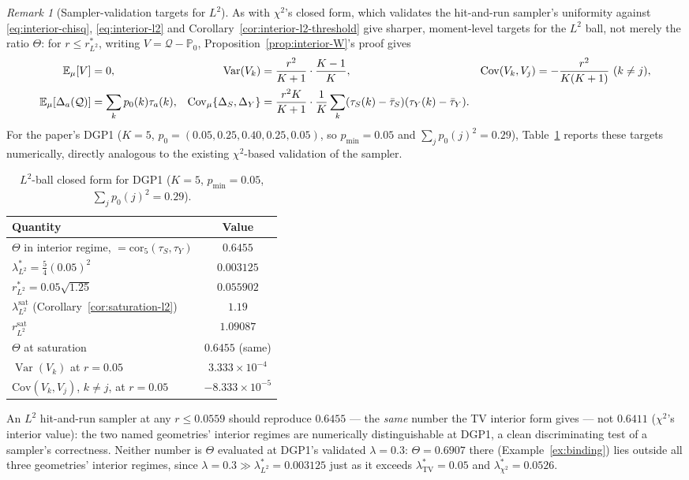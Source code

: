 \documentclass[11pt]{article}
\theoremstyle{plain}
\theoremstyle{definition}
\theoremstyle{remark}
\newtheorem{remark}[theorem]{Remark}
\newcommand{\E}{\mathbb{E}}
\newcommand{\PP}{\mathbb{P}}
\newcommand{\Q}{\mathcal{Q}}
\newcommand{\Cov}{\mathrm{Cov}}
\newcommand{\Corr}{\mathrm{cor}}
\DeclareMathOperator{\Var}{Var}
\begin{document}
\begin{remark}[Sampler-validation targets for $L^2$]\label{rem:l2-sampler-validation}
As with $\chi^2$'s closed form, which validates the hit-and-run sampler's uniformity
against \eqref{eq:interior-chisq}, \eqref{eq:interior-l2} and
Corollary~\ref{cor:interior-l2-threshold} give sharper, moment-level targets for the
$L^2$ ball, not merely the ratio $\Theta$: for $r\le r^*_{L^2}$, writing $V=\Q-\PP_0$,
Proposition~\ref{prop:interior-W}'s proof gives
\begin{align}
    \E_\mu[V]&=0, &
    \Var(V_k)&=\frac{r^2}{K+1}\cdot\frac{K-1}K, &
    \Cov(V_k,V_j)&=-\frac{r^2}{K(K+1)}\ (k\ne j),\notag\\
    \E_\mu[\Delta_a(\Q)]&=\sum_kp_0(k)\tau_a(k), &
    \Cov_\mu\{\Delta_S,\Delta_Y\}&=\frac{r^2K}{K+1}\cdot\frac1K\sum_k(\tau_S(k)-\bar\tau_S)(\tau_Y(k)-\bar\tau_Y). &&
\end{align}
For the paper's DGP1 ($K=5$, $p_0=(0.05,0.25,0.40,0.25,0.05)$, so $p_{\min}=0.05$ and
$\sum_jp_0(j)^2=0.29$), Table~\ref{tab:l2-dgp1} reports these targets numerically,
directly analogous to the existing $\chi^2$-based validation of the sampler.
\end{remark}

\begin{table}[ht]
\centering
\caption{$L^2$-ball closed form for DGP1 ($K=5$, $p_{\min}=0.05$,
$\sum_jp_0(j)^2=0.29$).}\label{tab:l2-dgp1}
\begin{tabular}{@{}lc@{}}
\toprule
Quantity & Value \\
\midrule
$\Theta$ in interior regime, $=\Corr_5(\tau_S,\tau_Y)$ & $0.6455$ \\
$\lambda^*_{L^2}=\frac54(0.05)^2$ & $0.003125$ \\
$r^*_{L^2}=0.05\sqrt{1.25}$ & $0.055902$ \\
$\lambda^{\mathrm{sat}}_{L^2}$ (Corollary~\ref{cor:saturation-l2}) & $1.19$ \\
$r^{\mathrm{sat}}_{L^2}$ & $1.09087$ \\
$\Theta$ at saturation & $0.6455$ (same) \\
$\Var(V_k)$ at $r=0.05$ & $3.333\times10^{-4}$ \\
$\Cov(V_k,V_j)$, $k\ne j$, at $r=0.05$ & $-8.333\times10^{-5}$ \\
\bottomrule
\end{tabular}
\end{table}

An $L^2$ hit-and-run sampler at any $r\le0.0559$ should reproduce $0.6455$ --- the
\emph{same} number the TV interior form gives --- not $0.6411$ ($\chi^2$'s interior
value): the two named geometries' interior regimes are numerically distinguishable at
DGP1, a clean discriminating test of a sampler's correctness. Neither number is
$\Theta$ evaluated at DGP1's validated $\lambda=0.3$: $\Theta=0.6907$ there
(Example~\ref{ex:binding}) lies outside all three geometries' interior regimes, since
$\lambda=0.3\gg\lambda^*_{L^2}=0.003125$ just as it exceeds
$\lambda^*_{\mathrm{TV}}=0.05$ and $\lambda^*_{\chi^2}=0.0526$.
\end{document}
